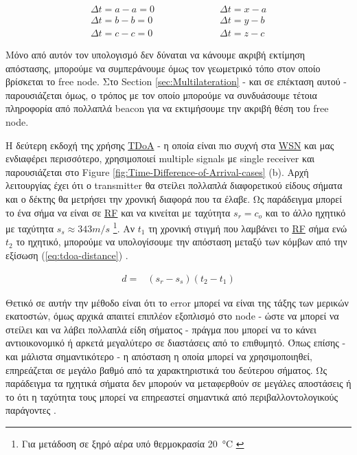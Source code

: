 \begin{align}
	\Delta t = a-a = 0 \quad \quad \quad & \quad \quad \quad\Delta t = x-a \nonumber \\
	\Delta t = b-b = 0 \quad \quad \quad & \quad \quad \quad\Delta t = y-b \nonumber \\
	\Delta t = c-c = 0 \quad \quad \quad & \quad \quad \quad\Delta t = z-c \nonumber
\end{align}

Μόνο από αυτόν τον υπολογισμό δεν δύναται να κάνουμε ακριβή εκτίμηση απόστασης, 
μπορούμε να συμπεράνουμε όμως τον γεωμετρικό τόπο στον οποίο βρίσκεται το free node. Στο Section \ref{sec:Multilateration} - και σε επέκταση αυτού -
παρουσιάζεται όμως, ο τρόπος με τον οποίο μπορούμε να συνδυάσουμε τέτοια πληροφορία από πολλαπλά beacon για να εκτιμήσουμε την ακριβή θέση του free node.

Η δεύτερη εκδοχή της χρήσης \hyperref[abbr:TDoA]{TDoA} - η οποία είναι πιο συχνή στα \hyperref[abbr:WSN]{WSN} και μας ενδιαφέρει περισσότερο, 
χρησιμοποιεί multiple signals με single receiver και παρουσιάζεται στο Figure \ref{fig:Time-Difference-of-Arrival-cases} (b). 
Αρχή λειτουργίας έχει ότι ο transmitter θα στείλει πολλαπλά διαφορετικού είδους σήματα και ο δέκτης θα μετρήσει την χρονική διαφορά 
που τα έλαβε. Ως παράδειγμα μπορεί το ένα σήμα να είναι σε \hyperref[abbr:RF]{RF} και να κινείται με ταχύτητα $s_r=c_o$ και το άλλο 
ηχητικό με ταχύτητα $s_s \approx 343m/s$ \footnote{Για μετάδοση σε ξηρό αέρα υπό θερμοκρασία \SI{20}{\celsius} \cite{wikipedia-speed-of-sound}}. 
Αν $t_1$ τη χρονική στιγμή που λαμβάνει το \hyperref[abbr:RF]{RF} σήμα ενώ $t_2$ το ηχητικό,
μπορούμε να υπολογίσουμε την απόσταση μεταξύ των κόμβων από την εξίσωση (\ref{eq:tdoa-distance})
\cite{wsn-Localization-systems}.

\begin{align}
	d=&(s_r-s_s)(t_2-t_1) \label{eq:tdoa-distance}
\end{align}

Θετικό σε αυτήν την μέθοδο είναι ότι το error μπορεί να είναι της τάξης των μερικών εκατοστών, όμως αρχικά απαιτεί επιπλέον εξοπλισμό στο node -
ώστε να μπορεί να στείλει και να λάβει πολλαπλά είδη σήματος - πράγμα που μπορεί να το κάνει αντιοικονομικό ή αρκετά μεγαλύτερο σε διαστάσεις από 
το επιθυμητό. Όπως επίσης - και μάλιστα  
σημαντικότερο - η απόσταση η οποία μπορεί να 
χρησιμοποιηθεί, επηρεάζεται σε μεγάλο βαθμό από τα χαρακτηριστικά του δεύτερου σήματος. Ως παράδειγμα τα ηχητικά σήματα 
δεν μπορούν να μεταφερθούν σε μεγάλες αποστάσεις ή το ότι η ταχύτητα τους μπορεί να επηρεαστεί σημαντικά από περιβαλλοντολογικούς παράγοντες
\cite{farooqiazam2016location}.

